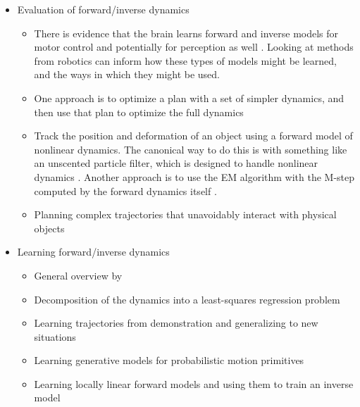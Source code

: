 \documentclass[12pt]{article}
\begin{document}
\begin{itemize}

\item Evaluation of forward/inverse dynamics
    \begin{itemize}
    \item There is evidence that the brain learns forward and inverse models for motor control \citep{Kawato1999,Flanagan2003} and potentially for perception as well \citep{Freyd1984,Freyd1988,Hubbard2005}. Looking at methods from robotics can inform how these types of models might be learned, and the ways in which they might be used.
    \item One approach is to optimize a plan with a set of simpler dynamics, and then use that plan to optimize the full dynamics \citep{Mordatch2010}
    \item Track the position and deformation of an object using a forward model of nonlinear dynamics. The canonical way to do this is with something like an unscented particle filter, which is designed to handle nonlinear dynamics \citep{Muller2003}. Another approach is to use the EM algorithm with the M-step computed by the forward dynamics itself \citep{Schulman2013b}.
    \item Planning complex trajectories that unavoidably interact with physical objects \citep{Kitaev2015}
    \end{itemize}

\item Learning forward/inverse dynamics
    \begin{itemize}
    \item General overview by \citep{Nguyen-Tuong2011}
    \item Decomposition of the dynamics into a least-squares regression problem \citep{Xie2015}
    \item Learning trajectories from demonstration and generalizing to new situations \citep{Schulman2013b,Lee2015}
    \item Learning generative models for probabilistic motion primitives \citep{Paraschos2015}
    \item Learning locally linear forward models and using them to train an inverse model \citep{Levine2015,Han2015}
    \end{itemize}


\end{itemize}
\end{document}
